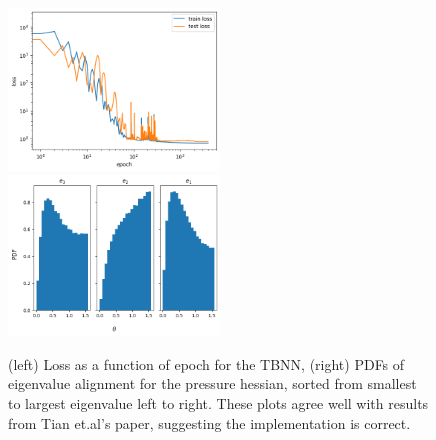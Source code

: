 \begin{figure}
    \centering
    \includegraphics[width=0.5\textwidth]{LagrangianDeformationModels/figs/trained_tbnn_loss.png}%
    \includegraphics[width=0.5\textwidth]{LagrangianDeformationModels/figs/tbnn_ph_eig_align.png}
    \caption{(left) Loss as a function of epoch for the TBNN, (right) PDFs of eigenvalue alignment for the pressure hessian, sorted from smallest to largest eigenvalue left to right. These plots agree well with results from Tian et.al's paper, suggesting the implementation is correct.}
    \label{fig:tbnn_reproduction_results}
\end{figure}

